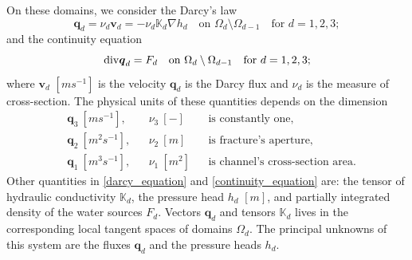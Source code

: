 \documentclass[times]{nlaauth}%
\def\div{{\rm div}}
\def\grad{\nabla}
\def\vc#1{\mathbf{\boldsymbol{#1}}}     %
\def\tn#1{{\mathbb{#1}}}    %
\begin{document}
On these domains, we consider the Darcy's law 
\begin{equation}
 \label{darcy_equation}
 \vc{q}_d = \nu_d \vc v_d = -\nu_d \tn{K}_d \grad h_d   \quad\text{on }\Omega_d \setminus\Omega_{d-1}\quad \text{for }d=1,2,3;
\end{equation}
and the continuity equation
\begin{equation}
   \label{continuity_equation}
   \div \vc{q}_d = F_d                          \quad \text{on }\Omega_d\setminus\Omega_{d-1} \quad \text{for }d=1,2,3;
\end{equation}
where  $\vc v_d$ $[ms^{-1}]$ is the velocity $\vc{q}_d$ is the Darcy flux and $\nu_d$ is the measure of cross-section. 
The physical units of these quantities depends on the dimension
\begin{align*}
    &\vc{q}_3\ [ms^{-1}], &&\nu_3\  [-] &&\text{is constantly one,} \\
    &\vc{q}_2\ [m^2s^{-1}], &&\nu_2\ [m] &&\text{is fracture's aperture,}\\
    &\vc{q}_1\ [m^3s^{-1}], &&\nu_1\ [m^2] &&\text{is channel's cross-section area.}
\end{align*}
Other quantities in \eqref{darcy_equation} and \eqref{continuity_equation} are: the tensor of hydraulic conductivity $\tn{K}_d$,
the pressure head $h_d$ $[m]$, and  partially integrated density of the water sources $F_d$.
Vectors $\vc{q}_d$ and tensors $\tn{K}_d$ lives in the corresponding local tangent spaces of domains $\Omega_d$. The principal unknowns of this system 
are the fluxes $\vc{q}_d$ and the pressure heads $h_d$.
\end{document}
